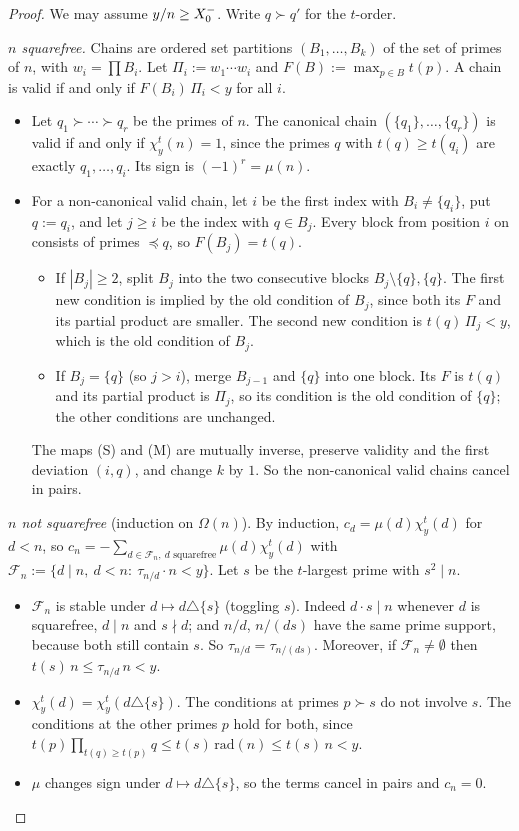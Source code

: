 \begin{proof}
We may assume $y/n\ge X_0^{-}$. Write $q\succ q'$ for the $t$-order.

\emph{$n$ squarefree.} Chains are ordered set partitions $(B_1,\dots,B_k)$ of the set of primes of $n$, with
$w_i=\prod B_i$. Let $\Pi_i:=w_1\cdots w_i$ and $F(B):=\max_{p\in B}t(p)$. A chain is valid if and only if
$F(B_i)\,\Pi_i<y$ for all $i$.
\begin{itemize}
\item Let $q_1\succ\cdots\succ q_r$ be the primes of $n$. The canonical chain $(\{q_1\},\dots,\{q_r\})$ is valid if and only
  if $\chi^t_y(n)=1$, since the primes $q$ with $t(q)\ge t(q_i)$ are exactly $q_1,\dots,q_i$. Its sign is
  $(-1)^r=\mu(n)$.
\item For a non-canonical valid chain, let $i$ be the first index with $B_i\ne\{q_i\}$, put $q:=q_i$, and let $j\ge i$
  be the index with $q\in B_j$. Every block from position $i$ on consists of primes $\preceq q$, so $F(B_j)=t(q)$.
  \begin{itemize}
  \item[(S)] If $|B_j|\ge2$, split $B_j$ into the two consecutive blocks $B_j\setminus\{q\},\{q\}$. The first new
    condition is implied by the old condition of $B_j$, since both its $F$ and its partial product are smaller. The second
    new condition is $t(q)\,\Pi_j<y$, which is the old condition of $B_j$.
  \item[(M)] If $B_j=\{q\}$ (so $j>i$), merge $B_{j-1}$ and $\{q\}$ into one block. Its $F$ is $t(q)$ and its partial
    product is $\Pi_j$, so its condition is the old condition of $\{q\}$; the other conditions are unchanged.
  \end{itemize}
  The maps (S) and (M) are mutually inverse, preserve validity and the first deviation $(i,q)$, and change $k$ by $1$.
  So the non-canonical valid chains cancel in pairs.
\end{itemize}

\emph{$n$ not squarefree} (induction on $\Omega(n)$). By induction, $c_d=\mu(d)\chi^t_y(d)$ for $d<n$, so
$c_n=-\sum_{d\in\mathcal F_n,\ d\text{ squarefree}}\mu(d)\chi^t_y(d)$ with
$\mathcal F_n:=\{d\mid n,\ d<n:\ \tau_{n/d}\cdot n<y\}$.
Let $s$ be the $t$-largest prime with $s^2\mid n$.
\begin{itemize}
\item $\mathcal F_n$ is stable under $d\mapsto d\triangle\{s\}$ (toggling $s$). Indeed $d\cdot s\mid n$ whenever $d$ is
  squarefree, $d\mid n$ and $s\nmid d$; and $n/d$, $n/(ds)$ have the same prime support, because both still contain $s$.
  So $\tau_{n/d}=\tau_{n/(ds)}$. Moreover, if $\mathcal F_n\ne\emptyset$ then $t(s)\,n\le\tau_{n/d}\,n<y$.
\item $\chi^t_y(d)=\chi^t_y(d\triangle\{s\})$. The conditions at primes $p\succ s$ do not involve $s$. The conditions at
  the other primes $p$ hold for both, since $t(p)\prod_{t(q)\ge t(p)}q\le t(s)\,\mathrm{rad}(n)\le t(s)\,n<y$.
\item $\mu$ changes sign under $d\mapsto d\triangle\{s\}$, so the terms cancel in pairs and $c_n=0$.\qedhere
\end{itemize}
\end{proof}

